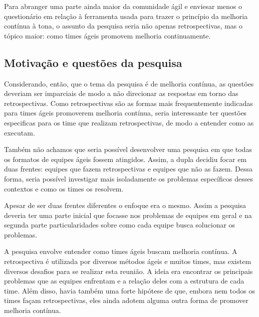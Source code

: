 Para abranger uma parte ainda maior da comunidade ágil e enviesar menos o questionário em relação à ferramenta usada para trazer o princípio da melhoria contínua à tona, o assunto da pesquisa seria não apenas retrospectivas, mas o tópico maior: como times ágeis promovem melhoria continuamente.


\subsection{Motivação e questões da pesquisa}

Considerando, então, que o tema da pesquisa é de melhoria contínua, as questões deveriam ser imparciais de modo a não direcionar as respostas em torno das retrospectivas. Como retrospectivas são as formas mais frequentemente indicadas para times ágeis promoverem melhoria contínua, seria interessante ter questões especificas para os time que realizam retrospectivas, de modo a entender como as executam.

Também não achamos que seria possível desenvolver uma pesquisa em que todas os formatos de equipes ágeis fossem atingidos. Assim, a dupla decidiu focar em duas frentes: equipes que fazem retrospectivas e equipes que não as fazem. Dessa forma, seria possível investigar mais isoladamente os problemas específicos desses contextos e como os times os resolvem.

Apesar de ser duas frentes diferentes o enfoque era o mesmo. Assim a pesquisa deveria ter uma parte inicial que focasse nos problemas de equipes em geral e na segunda parte particularidades sobre como cada equipe busca solucionar os problemas.

A pesquisa envolve entender como times ágeis buscam melhoria contínua. A retrospectiva é utilizada por diversos métodos ágeis e muitos times, mas existem diversos desafios para se realizar esta reunião. A ideia era encontrar os principais problemas que as equipes enfrentam e a relação deles com a estrutura de cada time. Além disso, havia também uma forte hipótese de que, embora nem todos os times façam retrospectivas, eles ainda adotem alguma outra forma de promover melhoria contínua. 

